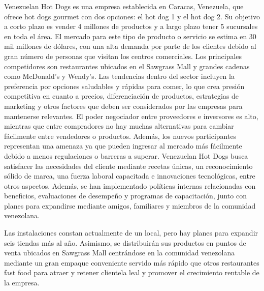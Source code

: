 Venezuelan Hot Dogs es una empresa establecida en Caracas, Venezuela, que ofrece hot dogs gourmet con dos opciones: el hot dog 1 y el hot dog 2. Su objetivo a corto plazo es vender 4 millones de productos y a largo plazo tener 5 sucursales en toda el área. El mercado para este tipo de producto o servicio se estima en 30 mil millones de dólares, con una alta demanda por parte de los clientes debido al gran número de personas que visitan los centros comerciales. Los principales competidores son restaurantes ubicados en el Sawgrass Mall y grandes cadenas como McDonald's y Wendy's.
Las tendencias dentro del sector incluyen la preferencia por opciones saludables y rápidas para comer, lo que crea presión competitiva en cuanto a precios, diferenciación de productos, estrategias de marketing y otros factores que deben ser considerados por las empresas para mantenerse relevantes. El poder negociador entre proveedores e inversores es alto, mientras que entre compradores no hay muchas alternativas para cambiar fácilmente entre vendedores o productos. Además, los nuevos participantes representan una amenaza ya que pueden ingresar al mercado más fácilmente debido a menos regulaciones o barreras a superar.
Venezuelan Hot Dogs busca satisfacer las necesidades del cliente mediante recetas únicas, un reconocimiento sólido de marca, una fuerza laboral capacitada e innovaciones tecnológicas, entre otros aspectos. Además, se han implementado políticas internas relacionadas con beneficios, evaluaciones de desempeño y programas de capacitación, junto con planes para expandirse mediante amigos, familiares y miembros de la comunidad venezolana.

Las instalaciones constan actualmente de un local, pero hay planes para expandir seis tiendas más al año. Asimismo, se distribuirán sus productos en puntos de venta ubicados en Sawgrass Mall centrándose en la comunidad venezolana mediante un gran empaque conveniente servido más rápido que otros restaurantes fast food para atraer y retener clientela leal y promover el crecimiento rentable de la empresa.
